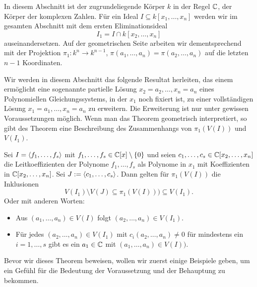 \documentclass[11pt]{article}
\numberwithin{equation}{section}
\begin{document}
In diesem Abschnitt ist der zugrundeliegende Körper $k$ in der Regel $\mathbb{C}$, der Körper der komplexen Zahlen. Für ein Ideal $I \subseteq k[x_1,\ldots,x_n]$ werden wir im gesamten Abschnitt mit dem ersten Eliminationsideal 
\[
	I_1 = I \cap k[x_2,\ldots,x_n]
\]
auseinandersetzen. Auf der geometrischen Seite arbeiten wir dementsprechend mit der Projektion $ \pi_1 : k^n \to k^{n-1}$, $\pi(a_1,\ldots,a_n) = \pi(a_2,\ldots,a_n)$ auf die letzten $n-1$ Koordinaten. 

Wir werden in diesem Abschnitt das folgende Resultat herleiten, das einem ermöglicht eine sogenannte partielle Lösung $x_2 = a_2,\ldots, x_n = a_n$ eines Polynomiellen Gleichungssystems, in der $x_1$ noch fixiert ist, zu einer vollständigen Lösung $x_1 = a_1,\ldots, x_n =a_n$ zu erweitern. Die Erweiterung ist nur unter gewissen Voraussetzungen möglich. Wenn man das Theorem geometrisch interpretiert, so gibt des Theorem  eine Beschreibung des Zusammenhangs von $\pi_1(V(I))$ und $V(I_1)$. 

\begin{theorem}[Projektionstheorem $=$ Erweiterungstheorem] 
	\label{proj:extension:thm}
	Sei $I = \left<  f_1,\ldots, f_s \right>$ mit $f_1,\ldots, f_s \in \mathbb{C}[x] \setminus \{0\}$ und seien $c_1,\ldots,c_s \in \mathbb{C}[x_2,\ldots,x_n]$ die Leitkoeffizienten der Polynome $f_1,\ldots,f_s$ als Polynome in $x_1$ mit Koeffizienten in $\mathbb{C}[x_2,\ldots,x_n]$. Sei $J := \left< c_1,\ldots,c_s \right>$. Dann gelten für $\pi_1(V(I))$ die Inklusionen 
	\[
		V(I_1) \setminus V(J) \subseteq \pi_1(V(I))) \subseteq V(I_1). 
	\]
	Oder mit anderen Worten: 
	\begin{itemize} 
		\item Aus $(a_1,\ldots,a_n) \in V(I)$ folgt $(a_2,\ldots,a_n) \in V(I_1)$. 
		\item Für jedes $(a_2,\ldots,a_n) \in V(I_1)$  mit $c_i(a_2,\ldots,a_n) \ne 0$ für mindestens ein $i =1,\ldots,s$ gibt es ein $a_1 \in \mathbb{C}$ mit $(a_1,\ldots,a_n) \in V(I))$. 
	\end{itemize} 
\end{theorem} 

Bevor wir dieses Theorem beweisen, wollen wir zuerst einige Beispiele geben, um ein Gefühl für die Bedeutung der Voraussetzung und der Behauptung zu bekommen. 
\end{document}
